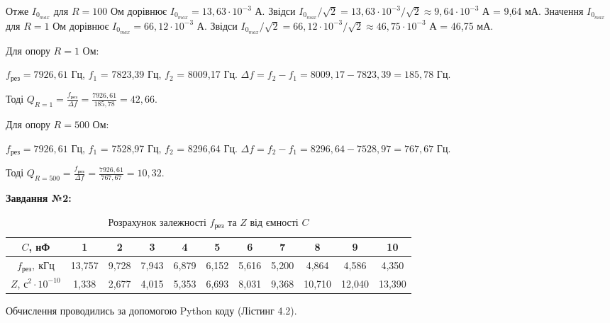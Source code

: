 \documentclass[12pt,a4paper]{article}
\begin{document}
    Отже $I_{0_{max}}$ для $R = 100$ Ом дорівнює $I_{0_{max}} = 13,63 \cdot 10^{-3}$ А. Звідси $I_{0_{max}}/\sqrt{2} = 13,63 \cdot 10^{-3}/\sqrt{2} \approx 9,64 \cdot 10^{-3}$ А = 9,64 мА.
    Значення $I_{0_{max}}$ для $R = 1$ Ом дорівнює $I_{0_{max}} = 66,12 \cdot 10^{-3}$ А. Звідси $I_{0_{max}}/\sqrt{2} = 66,12 \cdot 10^{-3}/\sqrt{2} \approx 46,75 \cdot 10^{-3}$ А = 46,75 мА.

    \vspace{1em}

    Для опору $R = 1$ Ом:

    $f_{\text{рез}} = 7926,61$ Гц, $f_1$ = 7823,39 Гц, $f_2$ = 8009,17 Гц. $\Delta f = f_2 - f_1 = 8009,17 - 7823,39 = 185,78$ Гц.

    Тоді $\displaystyle Q_{R = 1} = \frac{f_{\text{рез}}}{\Delta f} = \frac{7926,61}{185,78} = 42,66$.

    Для опору $R = 500$ Ом:

    $f_{\text{рез}} = 7926,61$ Гц, $f_1$ = 7528,97 Гц, $f_2$ = 8296,64 Гц. $\Delta f = f_2 - f_1 = 8296,64 - 7528,97 = 767,67$ Гц.

    Тоді $\displaystyle Q_{R = 500} = \frac{f_{\text{рез}}}{\Delta f} = \frac{7926,61}{767,67} = 10,32$.

    \vspace{2em}
    \setlength{\parindent}{0pt}

    \textbf{\large Завдання №2:}

    \vspace{1em}

    \begin{table}[h!]

        \centering
        \begin{tabular}{|c|*{10}{c|}}
        \hline
        $C$, нФ & 1 & 2 & 3 & 4 & 5 & 6 & 7 & 8 & 9 & 10 \\
        \hline
        $f_{\text{рез}},~\text{кГц}$ & 13,757 & 9,728 & 7,943 & 6,879 & 6,152 & 5,616 & 5,200 & 4,864 & 4,586 & 4,350 \\
        \hline
        $Z$, $\text{с}^2 \cdot 10^{-10}$ & 1,338 & 2,677 & 4,015 & 5,353 & 6,693 & 8,031 & 9,368 & 10,710 & 12,040 & 13,390 \\
        \hline
        \end{tabular}
        \caption{Розрахунок залежності $f_{\text{рез}}$ та $Z$ від ємності $C$}

    \end{table}

    Обчислення проводились за допомогою Python коду (Лістинг 4.2).
\end{document}
